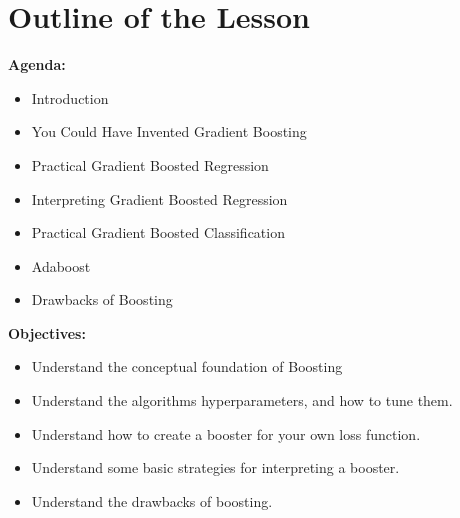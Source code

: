 \section{Outline of the Lesson}
%
\begin{frame}
\textbf{Agenda:}
 
  \begin{itemize}
    \item Introduction
    \item You Could Have Invented Gradient Boosting
    \item Practical Gradient Boosted Regression
    \item Interpreting Gradient Boosted Regression
    \item Practical Gradient Boosted Classification
    \item Adaboost
    \item Drawbacks of Boosting
  \end{itemize}

\end{frame}
%
\begin{frame}
\textbf{Objectives:}

  \begin{itemize}
    \item Understand the conceptual foundation of Boosting
    \item Understand the algorithms hyperparameters, and how to tune them.
    \item Understand how to create a booster for your own loss function.
    \item Understand some basic strategies for interpreting a booster.
    \item Understand the drawbacks of boosting.
  \end{itemize}
  
\end{frame}